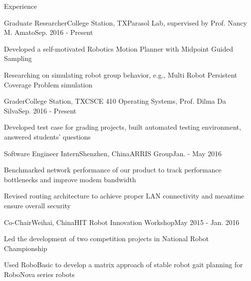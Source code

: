 \documentclass{resume} %
\begin{document}

\begin{rSection}{Experience}
\begin{rSubsection}{Graduate Researcher}{College Station, TX}{Parasol Lab, supervised by Prof. Nancy M. Amato}{Sep. 2016 - Present}
\item Developed a self-motivated Robotics Motion Planner with Midpoint Guided Sampling
\item Researching on simulating robot group behavior, e.g., Multi Robot Persistent Coverage Problem simulation
\end{rSubsection}
\begin{rSubsection}{Grader}{College Station, TX}{CSCE 410 Operating Systems, Prof. Dilma Da Silva}{Sep. 2016 - Present}
\item Developed test case for grading projects, built automated testing environment, answered students' questions
\end{rSubsection}

\begin{rSubsection}{Software Engineer Intern}{Shenzhen, China}{ARRIS Group}{Jan. - May 2016}
\item Benchmarked network performance of our product to track performance bottlenecks and improve modem bandwidth
\item Revised routing architecture to achieve proper LAN connectivity and meantime ensure overall security
\end{rSubsection}
\begin{rSubsection}{Co-Chair}{Weihai, China}{HIT Robot Innovation Workshop}{May 2015 - Jan. 2016}
\item Led the development of two competition projects in National Robot Championship
\item Used RoboBasic to develop a matrix approach of stable robot gait planning for RoboNova series robots
\end{rSubsection}
\end{rSection}
\end{document}
